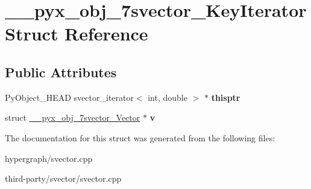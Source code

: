 \hypertarget{struct____pyx__obj__7svector__KeyIterator}{
\section{\_\-\_\-pyx\_\-obj\_\-7svector\_\-KeyIterator Struct Reference}
\label{struct____pyx__obj__7svector__KeyIterator}
}
\subsection*{Public Attributes}
\begin{DoxyCompactItemize}
\item 
\hypertarget{struct____pyx__obj__7svector__KeyIterator_a7f1d6bf6d4e702577dbc5c7e047aa40e}{
PyObject\_\-HEAD svector\_\-iterator$<$ int, double $>$ $\ast$ {\bfseries thisptr}}
\label{struct____pyx__obj__7svector__KeyIterator_a7f1d6bf6d4e702577dbc5c7e047aa40e}

\item 
\hypertarget{struct____pyx__obj__7svector__KeyIterator_a1d0872a1d18cd2a5d70153aa8d8faacd}{
struct \hyperlink{struct____pyx__obj__7svector__Vector}{\_\-\_\-pyx\_\-obj\_\-7svector\_\-Vector} $\ast$ {\bfseries v}}
\label{struct____pyx__obj__7svector__KeyIterator_a1d0872a1d18cd2a5d70153aa8d8faacd}

\end{DoxyCompactItemize}


The documentation for this struct was generated from the following files:\begin{DoxyCompactItemize}
\item 
hypergraph/svector.cpp\item 
third-\/party/svector/svector.cpp\end{DoxyCompactItemize}

